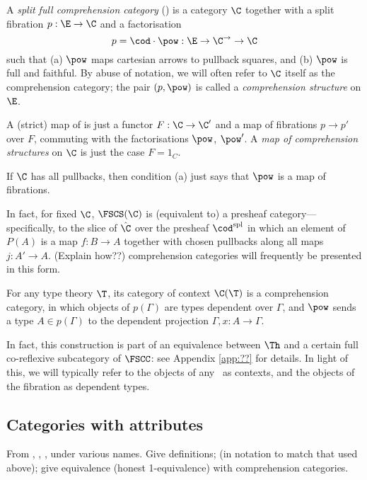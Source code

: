 \begin{definition} A \emph{split full comprehension category}\cite{jacobs:comprehension-categories} (\fscc) is a category $\C$ together with a split fibration $p : \E \to \C$ and a factorisation
$$p = \cod \cdot \pow : \E \to \C^\rightarrow \to \C$$such that (a) $\pow$ maps cartesian arrows to pullback squares, and (b) $\pow$ is full and faithful.  By abuse of notation, we will often refer to $\C$ itself as the comprehension category; the pair $(p,\pow)$ is called a \emph{comprehension structure} on $\E$.  

A (strict) map of \fsccs{} is just a functor $F: \C \to \C'$ and a map of fibrations $p \to p'$ over $F$, commuting with the factorisations $\pow$, $\pow'$.  A \emph{map of comprehension structures} on $\C$ is just the case $F = 1_C$.
\end{definition}

If $\C$ has all pullbacks, then condition (a) just says that $\pow$ is a map of fibrations.
 
In fact, for fixed $\C$, $\FSCS(\C)$ is (equivalent to) a presheaf category---specifically, to the slice of $\hat{\C}$ over the presheaf $\cod^{\mathrm{spl}}$ in which an element of $P(A)$ is a map $f : B \to A$ together with chosen pullbacks along all maps $j : A' \to A$.  (Explain how??)  comprehension categories will frequently be presented in this form.


\begin{example}For any type theory $\T$, its category of context $\C(\T)$ is a comprehension category, in which objects of $p(\Gamma)$ are types dependent over $\Gamma$, and $\pow$ sends a type $A \in p(\Gamma)$ to the dependent projection $\Gamma, x : A \to \Gamma$.
\end{example}

In fact, this construction is part of an equivalence between $\Th$ and a certain full co-reflexive subcategory of $\FSCC$: see Appendix \ref{app:??} for details.  In light of this, we will typically refer to the objects of any \fscc\ as contexts, and the objects of the fibration as dependent types.

\subsection*{Categories with attributes} 

From \cite{pitts:categorical-logic}, \cite{hofmann:syntax-and-semantics}, \cite{dybjer:internal-type-theory}, under various names.  Give definitions; (in notation to match that used above); give equivalence (honest 1-equivalence) with comprehension categories.

